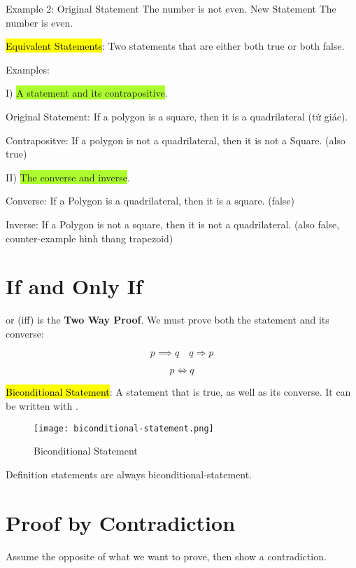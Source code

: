 Example 2: Original Statement The number is not even. New Statement The number is even.

\vspace{.6cm}

\hl{Equivalent Statements}: Two statements that are either both true or both false.

Examples:

I) \colorbox{GreenYellow}{A statement and its contrapositive}.

Original Statement: If a polygon is a square, then it is a quadrilateral (tứ giác).

Contrapositve: If a polygon is not a quadrilateral, then it is not a Square. (also true)

\vspace{.4cm}

II) \colorbox{GreenYellow}{The converse and inverse}.

Converse: If a Polygon is a quadrilateral, then it is a square. (false)

Inverse: If a Polygon is not a square, then it is not a quadrilateral. (also false, counter-example hình thang trapezoid)

\section{If and Only If}

 or (iff) is the \textbf{Two Way Proof}. We must prove both the statement and its converse:

\[p \implies q \quad q \Longrightarrow p\]

\[p \iff q\]

\hl{Biconditional Statement}: A statement that is true, as well as its converse. It can be written with .

\begin{figure}[htb!]
  \centering
  \texttt{[image: biconditional-statement.png]}
  \caption{Biconditional Statement}
\end{figure}

Definition statements are always biconditional-statement.

\section{Proof by Contradiction}

Assume the opposite of what we want to prove, then show a contradiction.

